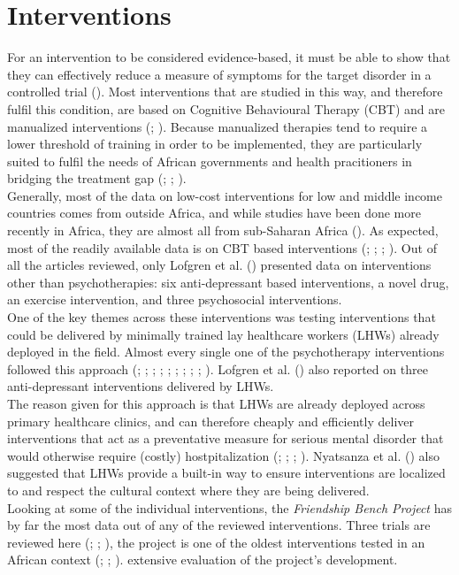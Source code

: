 \documentclass[stu,a4paper,12pt,donotrepeattitle]{apa7}
\begin{document}
\section{Interventions}
For an intervention to be considered evidence-based, it must be able to show
that they can effectively reduce a measure of symptoms for the target disorder
in a controlled trial (\cite{cook17}). Most interventions that are studied in
this way, and therefore fulfil this condition, are based on Cognitive
Behavioural Therapy (CBT) and are manualized interventions
(\cite{cook17}; \cite{shed18}). Because manualized therapies tend to require a
lower threshold of training in order to be implemented, they are particularly
suited to fulfil the needs of African governments and health pracitioners in
bridging the treatment gap (\cite{cook17}; \cite{douketal21}; \cite{lunetal14}).\\
Generally, most of the data on low-cost interventions for low and middle income
countries comes from outside Africa, and while studies have been done more
recently in Africa, they are almost all from sub-Saharan Africa
(\cite{logetal18}). As expected, most of the readily available data is on
CBT based interventions (\cite{chibandaetal11}; \cite{fernaetal21};
\cite{logetal18}; \cite{lunetal14}). Out of all the articles reviewed, only
Lofgren et al. (\citeyear{logetal18}) presented data on interventions other than
psychotherapies: six anti-depressant based interventions, a novel drug, an
exercise intervention, and three psychosocial interventions.\\
One of the key themes across these interventions was testing interventions that
could be delivered by minimally trained lay healthcare workers (LHWs) already
deployed in the field. Almost every single one of the psychotherapy interventions
followed this approach (\cite{abasetal16}; \cite{chibandaetal11};
\cite{chibandaetal15}; \cite{chibandaetal16}; \cite{douketal21};
\cite{fernaetal21}; \cite{logetal18}; \cite{lunetal14}; \cite{nyatetal16};
\cite{petersenetal14}). Lofgren et al. (\citeyear{logetal18}) also reported on
three anti-depressant interventions delivered by LHWs.\\
The reason given for this approach is that LHWs are already deployed across
primary healthcare clinics, and can therefore cheaply and efficiently deliver
interventions that act as a preventative measure for serious mental disorder
that would otherwise require (costly) hostpitalization (\cite{abasetal16};
\cite{douketal21}; \cite{fernaetal21}; \cite{lunetal14}). Nyatsanza et al.
(\citeyear{nyatetal16}) also suggested that LHWs provide a built-in way to
ensure interventions are localized to and respect the cultural context where
they are being delivered.\\
Looking at some of the individual interventions, the \textit{Friendship Bench
Project} has by far the most data out of any of the reviewed interventions.
Three trials are reviewed here (\cite{chibandaetal11}; \cite{chibandaetal15};
\cite{fernaetal21}), the project is one of the oldest interventions tested in
an African context (\cite{abasal16}; \cite{chibandaetal11}; \cite{fernaetal21}).
extensive evaluation of the project's development.
\end{document}
